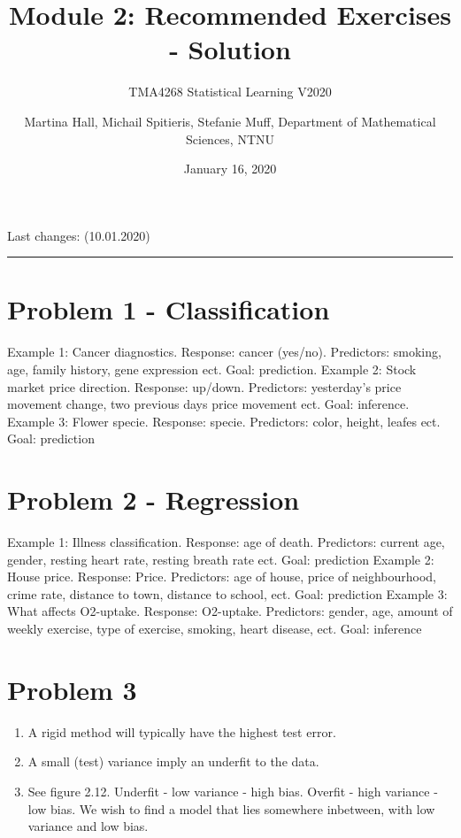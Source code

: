 \documentclass[]{article}
\title{Module 2: Recommended Exercises - Solution}
\subtitle{TMA4268 Statistical Learning V2020}
\author{Martina Hall, Michail Spitieris, Stefanie Muff, Department of
Mathematical Sciences, NTNU}
\date{January 16, 2020}
\providecommand{\tightlist}{%
  \setlength{\itemsep}{0pt}\setlength{\parskip}{0pt}}
\begin{document}
\maketitle

Last changes: (10.01.2020)

\begin{center}\rule{0.5\linewidth}{\linethickness}\end{center}

\section{Problem 1 - Classification}\label{problem-1---classification}

Example 1: Cancer diagnostics. Response: cancer (yes/no). Predictors:
smoking, age, family history, gene expression ect. Goal: prediction.
Example 2: Stock market price direction. Response: up/down. Predictors:
yesterday's price movement change, two previous days price movement ect.
Goal: inference. Example 3: Flower specie. Response: specie. Predictors:
color, height, leafes ect. Goal: prediction

\section{Problem 2 - Regression}\label{problem-2---regression}

Example 1: Illness classification. Response: age of death. Predictors:
current age, gender, resting heart rate, resting breath rate ect. Goal:
prediction Example 2: House price. Response: Price. Predictors: age of
house, price of neighbourhood, crime rate, distance to town, distance to
school, ect. Goal: prediction Example 3: What affects O2-uptake.
Response: O2-uptake. Predictors: gender, age, amount of weekly exercise,
type of exercise, smoking, heart disease, ect. Goal: inference

\section{Problem 3}\label{problem-3}

\begin{enumerate}
\def\labelenumi{\alph{enumi})}
\tightlist
\item
  A rigid method will typically have the highest test error.
\item
  A small (test) variance imply an underfit to the data.
\item
  See figure 2.12. Underfit - low variance - high bias. Overfit - high
  variance - low bias. We wish to find a model that lies somewhere
  inbetween, with low variance and low bias.
\end{enumerate}
\end{document}
